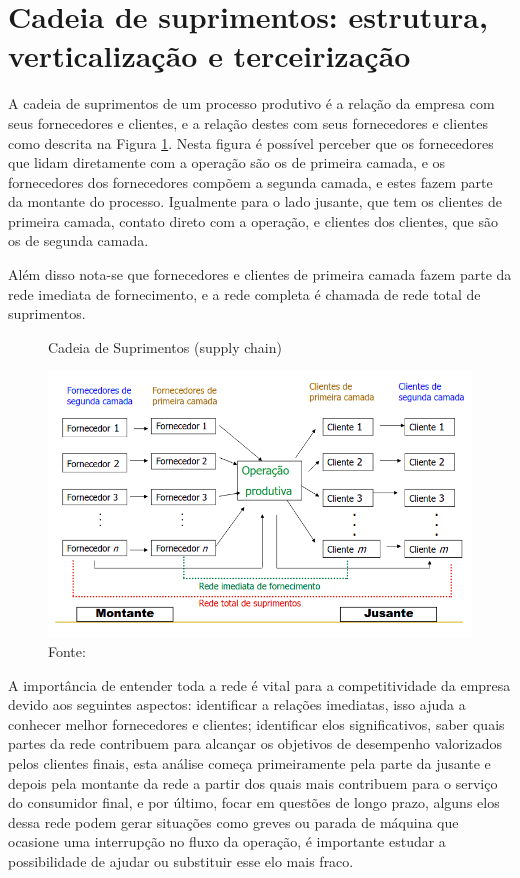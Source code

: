 \section{Cadeia de suprimentos: estrutura, verticalização e terceirização}
\label{sec:projetos_de_novas_supply_chain}
A cadeia de suprimentos de um processo produtivo é a relação da empresa com seus fornecedores e clientes, e a relação destes com seus fornecedores e clientes como descrita na Figura \ref{fig:supply_chain}. Nesta figura é possível perceber que os fornecedores que lidam diretamente com a operação são os de primeira camada, e os fornecedores dos fornecedores compõem a segunda camada, e estes fazem parte da montante do processo. Igualmente para o lado jusante, que tem os clientes de primeira camada, contato direto com a operação, e clientes dos clientes, que são os de segunda camada.
\par Além disso nota-se que fornecedores e clientes de primeira camada fazem parte da rede imediata de fornecimento, e a rede completa é chamada de rede total de suprimentos.


\begin{figure}[H]
    \centering
    \caption{Cadeia de Suprimentos (supply chain)}
    \includegraphics[width =\textwidth]{images/supply_chain.png}
    \caption*{Fonte: \cite{supplychain}}
    \label{fig:supply_chain}
\end{figure}

\par A importância de entender toda a rede é vital para a competitividade da empresa devido aos seguintes aspectos: identificar a relações imediatas, isso ajuda a conhecer melhor fornecedores e clientes; identificar elos significativos, saber quais partes da rede contribuem para alcançar os objetivos de desempenho valorizados pelos clientes finais, esta análise começa primeiramente pela parte da jusante e depois pela montante da rede a partir dos quais mais contribuem para o serviço do consumidor final, e por último, focar em questões de longo prazo, alguns elos dessa rede podem gerar situações como greves ou parada de máquina que ocasione uma interrupção no fluxo da operação, é importante estudar a possibilidade de ajudar ou substituir esse elo mais fraco.

